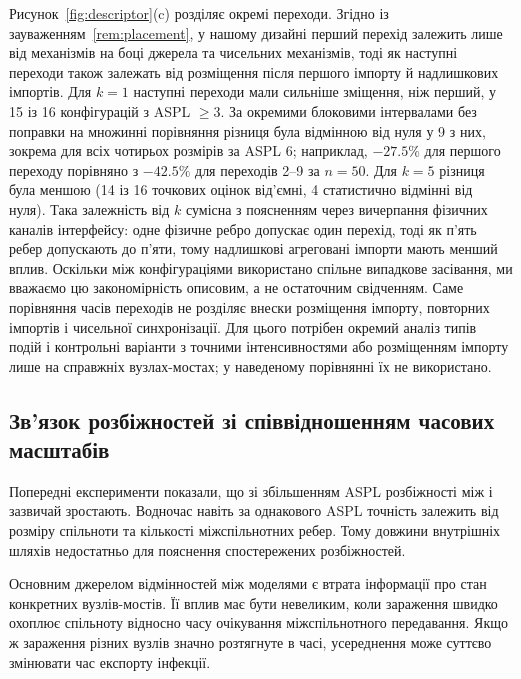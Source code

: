 Рисунок~\ref{fig:descriptor}(c) розділяє окремі переходи. Згідно із зауваженням~\ref{rem:placement}, у нашому дизайні перший перехід залежить лише від механізмів на боці джерела та чисельних механізмів, тоді як наступні переходи також залежать від розміщення після першого імпорту й надлишкових імпортів. Для $k=1$ наступні переходи мали сильніше зміщення, ніж перший, у 15 із 16 конфігурацій з ASPL $\ge3$. За окремими блоковими інтервалами без поправки на множинні порівняння різниця була відмінною від нуля у 9 з них, зокрема для всіх чотирьох розмірів за ASPL 6; наприклад, $-27.5\%$ для першого переходу порівняно з $-42.5\%$ для переходів 2--9 за $n=50$. Для $k=5$ різниця була меншою (14 із 16 точкових оцінок від'ємні, 4 статистично відмінні від нуля). Така залежність від $k$ сумісна з поясненням через вичерпання фізичних каналів інтерфейсу: одне фізичне ребро допускає один перехід, тоді як п'ять ребер допускають до п'яти, тому надлишкові агреговані імпорти мають менший вплив. Оскільки між конфігураціями використано спільне випадкове засівання, ми вважаємо цю закономірність описовим, а не остаточним свідченням. Саме порівняння часів переходів не розділяє внески розміщення імпорту, повторних імпортів і чисельної синхронізації. Для цього потрібен окремий аналіз типів подій і контрольні варіанти з точними інтенсивностями або розміщенням імпорту лише на справжніх вузлах-мостах; у наведеному порівнянні їх не використано.











\subsection{Зв'язок розбіжностей
зі співвідношенням часових масштабів}
\label{sec:res_descriptor}

Попередні експерименти показали,
що зі збільшенням ASPL розбіжності
між \Full{} і \TS{} зазвичай зростають.
Водночас навіть за однакового ASPL
точність залежить від розміру спільноти
та кількості міжспільнотних ребер.
Тому довжини внутрішніх шляхів
недостатньо для пояснення
спостережених розбіжностей.

Основним джерелом відмінностей
між моделями є втрата інформації
про стан конкретних вузлів-мостів.
Її вплив має бути невеликим,
коли зараження швидко охоплює
спільноту відносно часу очікування
міжспільнотного передавання.
Якщо ж зараження різних вузлів
значно розтягнуте в часі,
усереднення може суттєво змінювати
час експорту інфекції.

